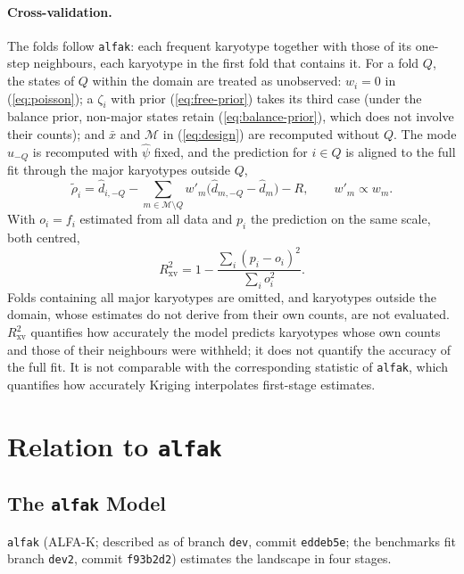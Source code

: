 \documentclass[11pt]{article}
\begin{document}
\paragraph{Cross-validation.}
The folds follow \texttt{alfak}: each frequent karyotype together with those
of its one-step neighbours, each karyotype in the first fold that contains
it. For a fold $Q$,
the states of $Q$ within the domain are treated as unobserved: $w_i=0$ in
(\ref{eq:poisson}); a $\zeta_i$ with prior (\ref{eq:free-prior}) takes its
third case (under the balance prior, non-major states retain
(\ref{eq:balance-prior}), which does not involve their counts); and $\bar x$
and $\mathcal{M}$ in (\ref{eq:design}) are recomputed without $Q$. The mode
$\hat u_{-Q}$ is recomputed with $\hat\psi$ fixed, and the prediction for
$i\in Q$ is aligned to the full fit through the major karyotypes outside $Q$,
\begin{equation}
  \tilde\rho_i=\hat d_{i,-Q}-\sum_{m\in\mathcal{M}\setminus Q}w'_m\bigl(\hat d_{m,-Q}-\hat d_m\bigr)-R,
  \qquad w'_m\propto w_m .
  \label{eq:xval-align}
\end{equation}
With $o_i=f_i$ estimated from all data and $p_i$ the prediction on the same
scale, both centred,
\begin{equation}
  R^2_{\mathrm{xv}}=1-\frac{\sum_i(p_i-o_i)^2}{\sum_io_i^2}.
  \label{eq:r2r}
\end{equation}
Folds containing all major karyotypes are omitted, and karyotypes outside the
domain, whose estimates do not derive from their own counts, are not
evaluated. $R^2_{\mathrm{xv}}$ quantifies how accurately the model predicts
karyotypes whose own counts and those of their neighbours were withheld; it
does not quantify the accuracy of the full fit. It is not comparable with the
corresponding statistic of \texttt{alfak}, which quantifies how accurately
Kriging interpolates first-stage estimates.

\section{Relation to \texttt{alfak}}
\label{sec:alfak}

\subsection{The \texttt{alfak} Model}

\texttt{alfak} (ALFA-K; described as of branch \texttt{dev}, commit
\texttt{eddeb5e}; the benchmarks fit branch \texttt{dev2}, commit
\texttt{f93b2d2})
estimates the landscape in four stages.
\end{document}

